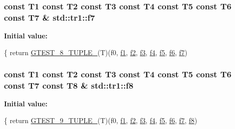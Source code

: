 \subsubsection[{\texorpdfstring{f7}{f7}}]{\setlength{\rightskip}{0pt plus 5cm}const T1 const T2 const T3 const T4 const T5 const T6 const T7 \& std\+::tr1\+::f7}\hypertarget{namespacestd_1_1tr1_a2185f3a1c07f2df072c39cb91ffa89a4}{}\label{namespacestd_1_1tr1_a2185f3a1c07f2df072c39cb91ffa89a4}
{\bfseries Initial value\+:}
\begin{DoxyCode}
\{
  \textcolor{keywordflow}{return} \hyperlink{gtest-tuple_8h_a2bc36d1a71a551e6cda2ac5504fb7ce3}{GTEST\_8\_TUPLE\_}(T)(f0, \hyperlink{namespacestd_1_1tr1_a9c0fa65b105f8e2f58ba59ecf75fd000}{f1}, \hyperlink{namespacestd_1_1tr1_a87dd9e009868361317f587126dba63d4}{f2}, \hyperlink{namespacestd_1_1tr1_a0f7c3b47d27d42d82d1a333ea420ce4e}{f3}, \hyperlink{namespacestd_1_1tr1_adc796e02b7385d526aff708189564f67}{f4}, \hyperlink{namespacestd_1_1tr1_a9c1eb66b2b2fa321942af95405232a0d}{f5}, \hyperlink{namespacestd_1_1tr1_a6b62f32e1e3e21bceb94eb46c4cbfd56}{f6}, 
      \hyperlink{namespacestd_1_1tr1_a2185f3a1c07f2df072c39cb91ffa89a4}{f7})
\end{DoxyCode}
\subsubsection[{\texorpdfstring{f8}{f8}}]{\setlength{\rightskip}{0pt plus 5cm}const T1 const T2 const T3 const T4 const T5 const T6 const T7 const T8 \& std\+::tr1\+::f8}\hypertarget{namespacestd_1_1tr1_ab998afa41cea8d6d26d7e4288b0bf974}{}\label{namespacestd_1_1tr1_ab998afa41cea8d6d26d7e4288b0bf974}
{\bfseries Initial value\+:}
\begin{DoxyCode}
\{
  \textcolor{keywordflow}{return} \hyperlink{gtest-tuple_8h_a1a81c17bfe3cdceb4d56b15985a44a7e}{GTEST\_9\_TUPLE\_}(T)(f0, \hyperlink{namespacestd_1_1tr1_a9c0fa65b105f8e2f58ba59ecf75fd000}{f1}, \hyperlink{namespacestd_1_1tr1_a87dd9e009868361317f587126dba63d4}{f2}, \hyperlink{namespacestd_1_1tr1_a0f7c3b47d27d42d82d1a333ea420ce4e}{f3}, \hyperlink{namespacestd_1_1tr1_adc796e02b7385d526aff708189564f67}{f4}, \hyperlink{namespacestd_1_1tr1_a9c1eb66b2b2fa321942af95405232a0d}{f5}, \hyperlink{namespacestd_1_1tr1_a6b62f32e1e3e21bceb94eb46c4cbfd56}{f6}, 
      \hyperlink{namespacestd_1_1tr1_a2185f3a1c07f2df072c39cb91ffa89a4}{f7}, \hyperlink{namespacestd_1_1tr1_ab998afa41cea8d6d26d7e4288b0bf974}{f8})
\end{DoxyCode}

